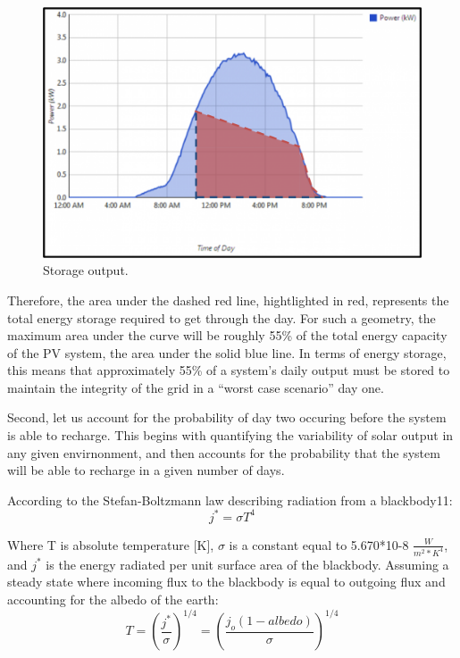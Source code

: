 \begin{figure}
\begin{center}
\includegraphics[scale=0.6]{pics/PatrickFigure2.png}
\caption{Storage output.}
\label{p2}
\end{center}
\end{figure}

Therefore, the area under the dashed red line, hightlighted in red, represents
the total energy storage required to get through the day. For such a geometry,
the maximum area under the curve will be roughly 55\% of the total energy
capacity of the PV system, the area under the solid blue line. In terms of
energy storage, this means that approximately 55\% of a system’s daily output
must be stored to maintain the integrity of the grid in a ``worst case scenario''
day one.

Second, let us account for the probability of day two occuring before the
system is able to recharge. This begins with quantifying the variability of
solar output in any given envirnonment, and then accounts for the probability
that the system will be able to recharge in a given number of days.

According to the Stefan-Boltzmann law describing radiation from a blackbody\cite{patrick}{11}:
\begin{equation}
j^* = \sigma T^4
\end{equation}

Where T is absolute temperature [K], $\sigma$ is a constant equal to 5.670*10-8
$\frac{W}{m^2*K^4}$, and $j^*$ is the energy radiated per unit surface area of
the blackbody.
Assuming a steady state where incoming flux to the blackbody is equal to
outgoing flux and accounting for the albedo of the earth:
\begin{equation}
T={(\frac{j^*}{\sigma})}^{1/4}=(\frac{j_o(1-albedo)}{\sigma})^{1/4}
\end{equation}


